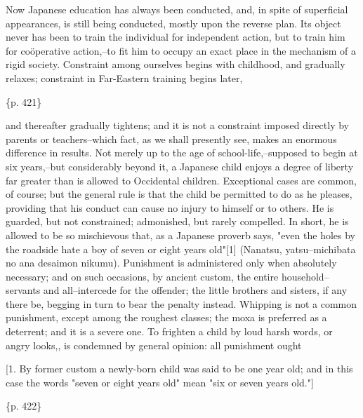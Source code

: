 Now Japanese education has always been conducted, and, in spite of superficial appearances, is still being conducted, mostly upon the reverse plan. Its object never has been to train the individual for independent action, but to train him for coöperative action,--to fit him to occupy an exact place in the mechanism of a rigid society. Constraint among ourselves begins with childhood, and gradually relaxes; constraint in Far-Eastern training begins later,

\{p. 421\}

and thereafter gradually tightens; and it is not a constraint imposed directly by parents or teachers--which fact, as we shall presently see, makes an enormous difference in results. Not merely up to the age of school-life,--supposed to begin at six years,--but considerably beyond it, a Japanese child enjoys a degree of liberty far greater than is allowed to Occidental children. Exceptional cases are common, of course; but the general rule is that the child be permitted to do as he pleases, providing that his conduct can cause no injury to himself or to others. He is guarded, but not constrained; admonished, but rarely compelled. In short, he is allowed to be so mischievous that, as a Japanese proverb says, "even the holes by the roadside hate a boy of seven or eight years old"[1] (Nanatsu, yatsu--michibata no ana desaimon nikumu). Punishment is administered only when absolutely necessary; and on such occasions, by ancient custom, the entire household--servants and all--intercede for the offender; the little brothers and sisters, if any there be, begging in turn to bear the penalty instead. Whipping is not a common punishment, except among the roughest classes; the moxa is preferred as a deterrent; and it is a severe one. To frighten a child by loud harsh words, or angry looks,, is condemned by general opinion: all punishment ought

[1. By former custom a newly-born child was said to be one year old; and in this case the words "seven or eight years old" mean "six or seven years old."]

\{p. 422\}

